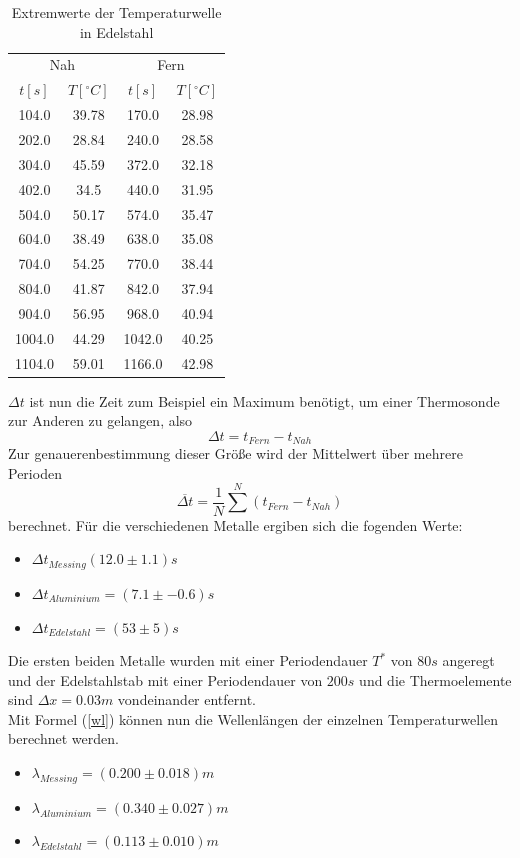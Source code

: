 \documentclass[11pt]{article}
\begin{document}
\begin{table}[P]
\centering
\label{stahl_extr}
\begin{tabular}{c|c||c|c}
\multicolumn{2}{c||}{Nah} & \multicolumn{2}{c}{Fern}\\
$t[s]$ & $T[^\circ C]$ & $t[s]$ & $T[^\circ C]$ \\
\hline
104.0 & 39.78 & 170.0 & 28.98\\
202.0 & 28.84 & 240.0 & 28.58\\
304.0 & 45.59 & 372.0 & 32.18\\
402.0 & 34.5 & 440.0 & 31.95\\
504.0 & 50.17 & 574.0 & 35.47\\
604.0 & 38.49 & 638.0 & 35.08\\
704.0 & 54.25 & 770.0 & 38.44\\
804.0 & 41.87 & 842.0 & 37.94\\
904.0 & 56.95 & 968.0 & 40.94\\
1004.0 & 44.29 & 1042.0 & 40.25\\
1104.0 & 59.01 & 1166.0 & 42.98\\
\end{tabular}
\caption{Extremwerte der Temperaturwelle in Edelstahl}
\end{table}
 $\Delta t$ ist nun die Zeit zum Beispiel ein Maximum benötigt, um einer Thermosonde zur Anderen zu gelangen, also
\begin{equation}
\Delta t = t_{Fern} - t_{Nah}
\end{equation}
Zur genauerenbestimmung dieser Größe wird der Mittelwert über mehrere Perioden 
\begin{equation}
\overline{\Delta t} = \frac1N \sum^N (t_{Fern}-t_{Nah})
\end{equation}
berechnet. Für die verschiedenen Metalle ergiben sich die fogenden Werte:
\begin{itemize}
\item$\Delta t_{Messing} (12.0\pm1.1)s$
\item $\Delta t_{Aluminium} = (7.1\pm-0.6)s$
\item $\Delta t_{Edelstahl} =  (53\pm5)s$
\end{itemize}
Die ersten beiden Metalle wurden mit einer Periodendauer $T^*$ von $80s$ angeregt und der Edelstahlstab mit einer Periodendauer von $200s$ und die Thermoelemente sind $\Delta x = 0.03m$ vondeinander entfernt. \\Mit Formel (\ref{wl}) können nun die Wellenlängen der einzelnen Temperaturwellen berechnet werden. 
\begin{itemize}
\item $\lambda_{Messing}=(0.200\pm0.018)m$
\item $\lambda_{Aluminium}=(0.340\pm0.027)m$
\item $\lambda_{Edelstahl}=(0.113\pm0.010)m$
\end{itemize}
\end{document}

